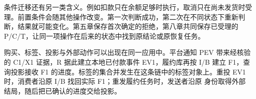 条件迁移还有另一类含义。例如扣款只在余额足够时执行，取消只在尚未发货时受理。前置条件会随其他操作改变。第一次判断成功，第二次在不同状态下重新判断，结果就可能变化。第五章保存首次确定的拒绝，第八章共同保存已受理的 P/C/T，让同一项操作在后来的状态中找到原结论或原恢复任务。


购买、标签、投影与外部动作可以出现在同一应用中。平台通知 PEV 带来经核验的 C1/X1 证据，R 据此建立本地已付款事件 EV1，履约库再按 I/B 建立 F1，查询投影接收 F1 的进度。标签的集合并发生在这条链中的标签对象上。重投 EV1 时，消费者沿原 I/B 找回实际 F1；重发履约任务时，发送者沿原  身份取得外部结局，随后把已确认的进度交给投影。
\FloatBarrier
